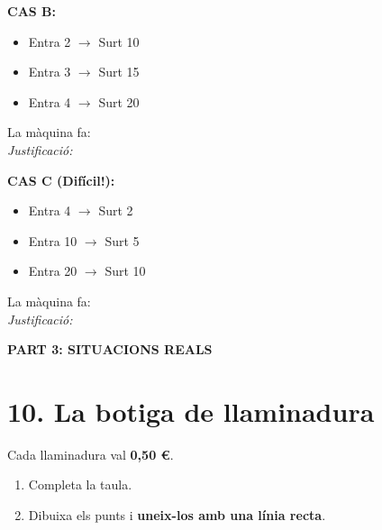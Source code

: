 \documentclass[12pt,a4paper]{article}
\begin{document}
\vspace{0.5cm}
\textbf{CAS B:}
\begin{itemize}
    \item Entra 2 $\to$ Surt 10
    \item Entra 3 $\to$ Surt 15
    \item Entra 4 $\to$ Surt 20
\end{itemize}
La màquina fa: \hrulefill \\
\textit{Justificació:} \hrulefill

\vspace{0.5cm}
\textbf{CAS C (Difícil!):}
\begin{itemize}
    \item Entra 4 $\to$ Surt 2
    \item Entra 10 $\to$ Surt 5
    \item Entra 20 $\to$ Surt 10
\end{itemize}
La màquina fa: \hrulefill \\
\textit{Justificació:} \hrulefill

\vspace{1cm}

\newpage
\begin{center}
    {\Large \textbf{PART 3: SITUACIONS REALS}}
\end{center}

\section*{10. La botiga de llaminadura}
Cada llaminadura val \textbf{0,50 €}. 
\begin{enumerate}
    \item Completa la taula.
    \item Dibuixa els punts i \textbf{uneix-los amb una línia recta}.
\end{enumerate}
\end{document}
